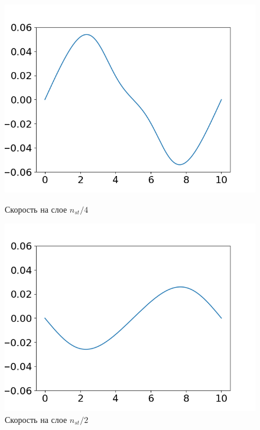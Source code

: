 \documentclass[12pt,a4paper]{article}
\begin{document}
\begin{figure}[h]
	\begin{minipage}[h]{0.47\linewidth}
		\centering
		\includegraphics[width=1\linewidth]{pics/task2/14u_1.png} 
		\caption{Скорость на слое $n_{st} / 4$}
	\end{minipage}
	\hfill
	\begin{minipage}[h]{0.47\linewidth}
		\centering
		\includegraphics[width=1\linewidth]{pics/task2/24u_1.png} 
		\caption{Скорость на слое $n_{st} / 2$}
	\end{minipage}
	\vfill
	\begin{minipage}[h]{0.47\linewidth}
		\centering

\end{minipage}
\end{figure}
\end{document}
